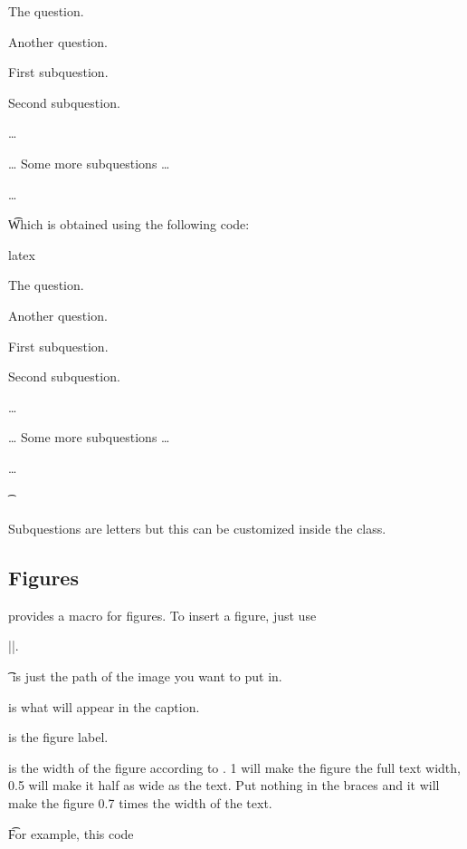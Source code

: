 \documentclass[a4paper, 11pt]{old-dms}
\begin{document}
\setcounter{question}{1}

\q The question.

\q Another question.

\sq First subquestion.

\sq Second subquestion.

\q \sq \dots

\sq \dots{} Some more subquestions \dots

\sq \dots

\t

Which is obtained using the following code:
\begin{codeboxnonos}{latex}
\setcounter{question}{1}

\q The question.

\q Another question.

\sq First subquestion.

\sq Second subquestion.

\q \sq \dots

\sq \dots{} Some more subquestions \dots

\sq \dots

\t
\end{codeboxnonos}

Subquestions are letters but this can be customized inside the class.

\subsection{Figures}

 provides a macro for figures. To insert a figure, just use

||.

\t

 is just the path of the image you want to put in.

 is what will appear in the caption.

 is the figure label.

 is the width of the figure according to . 1 will make the figure the full text width, 0.5 will make it half as wide as the text. Put nothing in the braces and it will make the figure 0.7 times the width of the text.

\t

For example, this code
\end{document}
